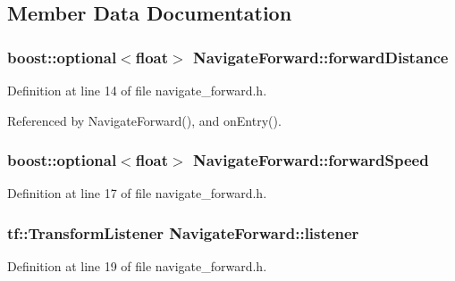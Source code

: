 \subsection{Member Data Documentation}
\subsubsection[{\texorpdfstring{forward\+Distance}{forwardDistance}}]{\setlength{\rightskip}{0pt plus 5cm}boost\+::optional$<$float$>$ Navigate\+Forward\+::forward\+Distance}\hypertarget{classNavigateForward_ad2b2157f0a2c94fd9e1f11ae22d203fc}{}\label{classNavigateForward_ad2b2157f0a2c94fd9e1f11ae22d203fc}


Definition at line 14 of file navigate\+\_\+forward.\+h.



Referenced by Navigate\+Forward(), and on\+Entry().

\subsubsection[{\texorpdfstring{forward\+Speed}{forwardSpeed}}]{\setlength{\rightskip}{0pt plus 5cm}boost\+::optional$<$float$>$ Navigate\+Forward\+::forward\+Speed}\hypertarget{classNavigateForward_a887de966940cd56b2c159a5b08e9f9e0}{}\label{classNavigateForward_a887de966940cd56b2c159a5b08e9f9e0}


Definition at line 17 of file navigate\+\_\+forward.\+h.

\subsubsection[{\texorpdfstring{listener}{listener}}]{\setlength{\rightskip}{0pt plus 5cm}tf\+::\+Transform\+Listener Navigate\+Forward\+::listener}\hypertarget{classNavigateForward_a40927a8ea2a861c7bb3ece9256600552}{}\label{classNavigateForward_a40927a8ea2a861c7bb3ece9256600552}


Definition at line 19 of file navigate\+\_\+forward.\+h.

